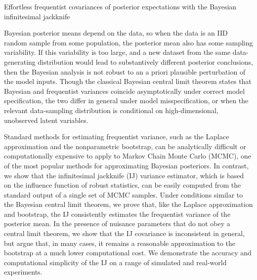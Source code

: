 Effortless frequentist covariances of posterior expectations with the Bayesian infinitesimal jackknife

Bayesian posterior means depend on the data, so when the data is an IID random
sample from some population, the posterior mean also has some sampling
variability. If this variability is too large, and a new dataset from the same
data-generating distribution would lead to substantively different posterior
conclusions, then the Bayesian analysis is not robust to an a priori
plausible perturbation of the model inputs. Though the classical Bayesian
central limit theorem states that Bayesian and frequentist variances coincide
asymptotically under correct model specification, the two differ in general
under model misspecification, or when the relevant data-sampling distribution is
conditional on high-dimensional, unobserved latent variables.

Standard methods for estimating frequentist variance, such as the Laplace
approximation and the nonparametric bootstrap, can be analytically difficult or
computationally expensive to apply to Markov Chain Monte Carlo (MCMC), one of
the most popular methods for approximating Bayesian posteriors.  In contrast, we
show that the infinitesimal jackknife (IJ) variance estimator, which is based on
the influence function of robust statistics, can be easily computed from the
standard output of a single set of MCMC samples.  Under conditions similar to
the Bayesian central limit theorem, we prove that, like the Laplace
approximation and bootstrap, the IJ consistently estimates the frequentist
variance of the posterior mean.  In the presence of nuisance parameters that do
not obey a central limit theorem, we show that the IJ covariance is inconsistent
in general, but argue that, in many cases, it remains a reasonable approximation
to the bootstrap at a much lower computational cost. We demonstrate the accuracy
and computational simplicity of the IJ on a range of simulated and real-world
experiments.
